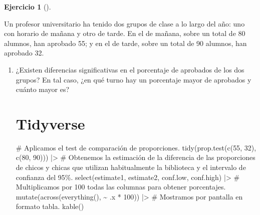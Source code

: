 \documentclass[
  a4paper,
]{scrreport}
\newenvironment{Shaded}{\begin{snugshade}}{\end{snugshade}}
\newcommand{\CommentTok}[1]{\textcolor[rgb]{0.37,0.37,0.37}{#1}}
\newcommand{\DecValTok}[1]{\textcolor[rgb]{0.68,0.00,0.00}{#1}}
\newcommand{\FunctionTok}[1]{\textcolor[rgb]{0.28,0.35,0.67}{#1}}
\newcommand{\NormalTok}[1]{\textcolor[rgb]{0.00,0.23,0.31}{#1}}
\newcommand{\SpecialCharTok}[1]{\textcolor[rgb]{0.37,0.37,0.37}{#1}}
\theoremstyle{definition}
\newtheorem{exercise}{Ejercicio}[chapter]
\theoremstyle{remark}
\begin{document}
\begin{exercise}[]\protect\hypertarget{exr-intervalo-comparacion-proporciones-aprobados}{}\label{exr-intervalo-comparacion-proporciones-aprobados}

Un profesor universitario ha tenido dos grupos de clase a lo largo del
año: uno con horario de mañana y otro de tarde. En el de mañana, sobre
un total de 80 alumnos, han aprobado 55; y en el de tarde, sobre un
total de 90 alumnos, han aprobado 32.

\begin{enumerate}
\def\labelenumi{\alph{enumi}.}
\item
  ¿Existen diferencias significativas en el porcentaje de aprobados de
  los dos grupos? En tal caso, ¿en qué turno hay un porcentaje mayor de
  aprobados y cuánto mayor es?

  \begin{tcolorbox}[enhanced jigsaw, colframe=quarto-callout-tip-color-frame, toprule=.15mm, bottomtitle=1mm, breakable, opacitybacktitle=0.6, toptitle=1mm, colback=white, bottomrule=.15mm, title=\textcolor{quarto-callout-tip-color}{\faLightbulb}\hspace{0.5em}{Solución}, arc=.35mm, left=2mm, titlerule=0mm, rightrule=.15mm, coltitle=black, leftrule=.75mm, opacityback=0, colbacktitle=quarto-callout-tip-color!10!white]

  \section{Tidyverse}

\begin{Shaded}
\begin{Highlighting}[]
\CommentTok{\# Aplicamos el test de comparación de proporciones.}
\FunctionTok{tidy}\NormalTok{(}\FunctionTok{prop.test}\NormalTok{(}\FunctionTok{c}\NormalTok{(}\DecValTok{55}\NormalTok{, }\DecValTok{32}\NormalTok{), }\FunctionTok{c}\NormalTok{(}\DecValTok{80}\NormalTok{, }\DecValTok{90}\NormalTok{))) }\SpecialCharTok{|\textgreater{}} 
\CommentTok{\# Obtenemos la estimación de la diferencia de las proporciones de chicos y chicas que utilizan habitualmente la biblioteca y el intervalo de confianza del 95\%.}
    \FunctionTok{select}\NormalTok{(estimate1, estimate2, conf.low, conf.high) }\SpecialCharTok{|\textgreater{}} 
    \CommentTok{\# Multiplicamos por 100 todas las columnas para obtener porcentajes.}
    \FunctionTok{mutate}\NormalTok{(}\FunctionTok{across}\NormalTok{(}\FunctionTok{everything}\NormalTok{(), }\SpecialCharTok{\textasciitilde{}}\NormalTok{ .x }\SpecialCharTok{*} \DecValTok{100}\NormalTok{)) }\SpecialCharTok{|\textgreater{}} 
    \CommentTok{\# Mostramos por pantalla en formato tabla.}
    \FunctionTok{kable}\NormalTok{()}
\end{Highlighting}
\end{Shaded}


\end{tcolorbox}
\end{enumerate}
\end{exercise}
\end{document}
